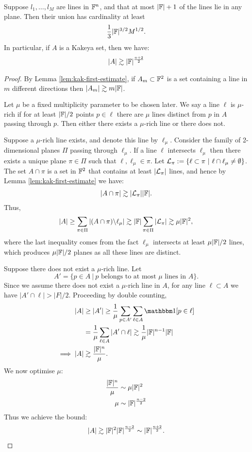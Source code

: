 \begin{theorem}
    Suppose $l_1, \dots , l_M$ are lines in $\mathbb F^n$, and that at most $|\mathbb F| +1$ of the lines lie in any plane.
    Then their union has cardinality at least 
    \[
        \frac{1}{3}    |\mathbb F|^{3/2} M^{1/2}.
    \]
    In particular, if $A$ is a Kakeya set, then we have:
    \[
        |A| \gtrsim |\mathbb F|^{\frac{n+2}{2}}    
    \]
\end{theorem}
\begin{proof}
By Lemma \ref{lem:kak-first-estimate}, if $A_m \subset \mathbb F^2$ is a set containing a line in $m$ different directions then $|A_m| \gtrsim m|\mathbb F|$.

Let $\mu$ be a fixed multiplicity parameter to be chosen later. We say a line $\ell$ is $\mu$-rich if for at least $|\mathbb F|/2$ points $p\in \ell$ there are $\mu$ lines distinct from $p$
in $A$ passing through $p$. Then either there exists a $\mu$-rich line or there does not. 

Suppose a $\mu$-rich line exists, and denote this line by $\ell_\mu$. Consider the family of 2-dimensional planes $\Pi$ passing through $\ell_\mu$. 
If a line $\ell$ intersects $\ell_\mu$ then there exists a unique plane $\pi \in \Pi$ such that $\ell, \ell_\mu \in \pi$. 
Let $\mathcal L_\pi := \{\ell \subset \pi \ | \ \ell \cap \ell_\mu \neq \emptyset \}$. The set $A \cap \pi$ is a set in $\mathbb F^2$ that contains at least $|\mathcal L_\pi|$
lines, and hence by Lemma \ref{lem:kak-first-estimate} we have:
\[
|A \cap \pi| \gtrsim |\mathcal L_\pi| |\mathbb F|.
\]
Thus,
\[
    |A| \geq \sum_{\pi \in \Pi} |(A \cap \pi) \backslash \ell_\mu| \gtrsim |\mathbb F| \sum_{\pi \in \Pi} |\mathcal L_\pi| \gtrsim \mu |\mathbb F|^2,
\]
where the last inequality comes from the fact $\ell_\mu$ intersects at least $\mu |\mathbb F|/2$ lines, which produces $\mu |\mathbb F|/2$ planes as all these lines are distinct.

Suppose there does not exist a $\mu$-rich line. Let 
\[
    A' = \{p \in A \ | \ p \text{ belongs to at most } \mu \text{ lines in }A \}.
\]
Since we assume there does not exist a $\mu$-rich line in $A$, for any line $\ell \subset A$ we have $|A' \cap \ell| > |F|/2$. 
Proceeding by double counting, 
\begin{align*}
    |A| &\geq |A'|\geq \frac{1}{\mu} \sum_{p \in A'} \sum_{\ell \in A} \OO[p \in \ell] \\
    &= \frac{1}{\mu} \sum_{\ell \in A} |A' \cap \ell| \gtrsim \frac{1}{\mu} |\FF|^{n-1}|\FF|\\
    \implies |A| &\gtrsim \frac{|\FF|^n}{\mu}.
\end{align*}
We now optimise $\mu$:
\begin{align*}
    \frac{|\mathbb F|^n}{\mu} &\sim \mu |\mathbb F|^2 \\
    \mu &\sim |\mathbb F|^{\frac{n-2}{2}}
\end{align*}
Thus we achieve the bound:
\[
    |A| \gtrsim |\mathbb F|^2|\mathbb F|^{\frac{n-2}{2}} \sim |\mathbb F|^{\frac{n+2}{2}}.
\]
\end{proof}

